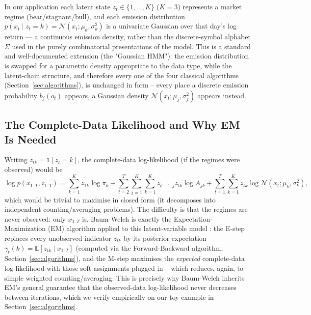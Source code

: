 In our application each latent state $z_t \in \{1, \ldots, K\}$ ($K=3$)
represents a market regime (bear/stagnant/bull), and each emission
distribution $p(x_t \mid z_t = k) = \mathcal{N}(x_t; \mu_k, \sigma_k^2)$
is a univariate Gaussian over that day's log return --- a continuous
emission density, rather than the discrete-symbol alphabet $\Sigma$ used
in the purely combinatorial presentations of the model. This is a
standard and well-documented extension (the "Gaussian HMM"): the
emission distribution is swapped for a parametric density appropriate to
the data type, while the latent-chain structure, and therefore every one
of the four classical algorithms (Section~\ref{sec:algorithms}), is
unchanged in form -- every place a discrete emission probability
$b_j(o_t)$ appears, a Gaussian density $\mathcal{N}(x_t; \mu_j,
\sigma_j^2)$ appears instead.

\subsection{The Complete-Data Likelihood and Why EM Is Needed}

Writing $z_{tk} = \mathbb{1}[z_t = k]$, the complete-data log-likelihood
(if the regimes were observed) would be
\[
  \log p(x_{1:T}, z_{1:T}) = \sum_{k=1}^{K} z_{1k} \log \pi_k
    + \sum_{t=2}^{T} \sum_{j=1}^{K} \sum_{k=1}^{K} z_{t-1,j} z_{tk} \log A_{jk}
    + \sum_{t=1}^{T} \sum_{k=1}^{K} z_{tk} \log \mathcal{N}(x_t; \mu_k, \sigma_k^2),
\]
which would be trivial to maximise in closed form (it decomposes into
independent counting/averaging problems). The difficulty is that the
regimes are never observed: only $x_{1:T}$ is. Baum-Welch is exactly the
Expectation-Maximization (EM) algorithm applied to this latent-variable
model \autocite{bishop2006prml}: the E-step replaces every unobserved
indicator $z_{tk}$ by its posterior expectation $\gamma_t(k) =
\mathbb{E}[z_{tk} \mid x_{1:T}]$ (computed via the Forward-Backward
algorithm, Section~\ref{sec:algorithms}), and the M-step maximises the
\emph{expected} complete-data log-likelihood with those soft
assignments plugged in -- which reduces, again, to simple weighted
counting/averaging. This is precisely why Baum-Welch inherits EM's
general guarantee that the observed-data log-likelihood never decreases
between iterations, which we verify empirically on our toy example in
Section~\ref{sec:algorithms}.

